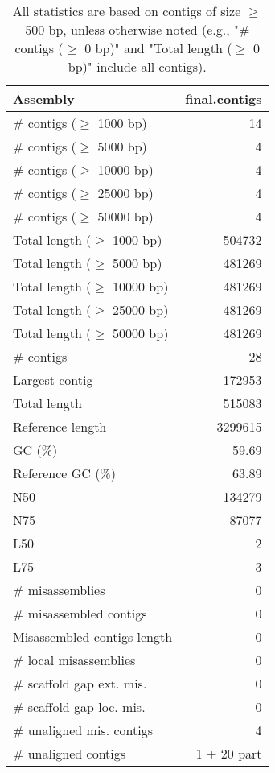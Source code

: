 \documentclass[12pt,a4paper]{article}
\begin{document}
\begin{table}[ht]
\begin{center}
\caption{All statistics are based on contigs of size $\geq$ 500 bp, unless otherwise noted (e.g., "\# contigs ($\geq$ 0 bp)" and "Total length ($\geq$ 0 bp)" include all contigs).}
\begin{tabular}{|l*{1}{|r}|}
\hline
Assembly & final.contigs \\ \hline
\# contigs ($\geq$ 1000 bp) & 14 \\ \hline
\# contigs ($\geq$ 5000 bp) & 4 \\ \hline
\# contigs ($\geq$ 10000 bp) & 4 \\ \hline
\# contigs ($\geq$ 25000 bp) & 4 \\ \hline
\# contigs ($\geq$ 50000 bp) & 4 \\ \hline
Total length ($\geq$ 1000 bp) & 504732 \\ \hline
Total length ($\geq$ 5000 bp) & 481269 \\ \hline
Total length ($\geq$ 10000 bp) & 481269 \\ \hline
Total length ($\geq$ 25000 bp) & 481269 \\ \hline
Total length ($\geq$ 50000 bp) & 481269 \\ \hline
\# contigs & 28 \\ \hline
Largest contig & 172953 \\ \hline
Total length & 515083 \\ \hline
Reference length & 3299615 \\ \hline
GC (\%) & 59.69 \\ \hline
Reference GC (\%) & 63.89 \\ \hline
N50 & 134279 \\ \hline
N75 & 87077 \\ \hline
L50 & 2 \\ \hline
L75 & 3 \\ \hline
\# misassemblies & 0 \\ \hline
\# misassembled contigs & 0 \\ \hline
Misassembled contigs length & 0 \\ \hline
\# local misassemblies & 0 \\ \hline
\# scaffold gap ext. mis. & 0 \\ \hline
\# scaffold gap loc. mis. & 0 \\ \hline
\# unaligned mis. contigs & 4 \\ \hline
\# unaligned contigs & 1 + 20 part \\ \hline

\end{tabular}
\end{center}
\end{table}
\end{document}
